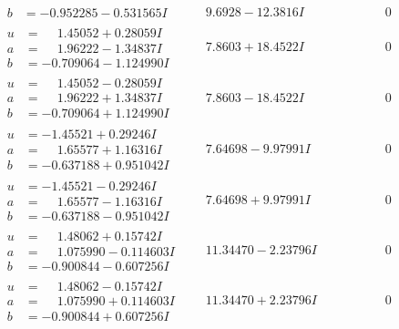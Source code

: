 \documentclass[1p]{elsarticle_modified}
\theoremstyle{definition}
\begin{document}
$$\begin{array}{c|c|c}
\begin{aligned}
b &= -0.952285 - 0.531565 I\end{aligned}
 & \phantom{-}9.6928 - 12.3816 I & \phantom{-0.000000 } 0 \\ \hline\begin{aligned}
u &= \phantom{-}1.45052 + 0.28059 I \\
a &= \phantom{-}1.96222 - 1.34837 I \\
b &= -0.709064 - 1.124990 I\end{aligned}
 & \phantom{-}7.8603 + 18.4522 I & \phantom{-0.000000 } 0 \\ \hline\begin{aligned}
u &= \phantom{-}1.45052 - 0.28059 I \\
a &= \phantom{-}1.96222 + 1.34837 I \\
b &= -0.709064 + 1.124990 I\end{aligned}
 & \phantom{-}7.8603 - 18.4522 I & \phantom{-0.000000 } 0 \\ \hline\begin{aligned}
u &= -1.45521 + 0.29246 I \\
a &= \phantom{-}1.65577 + 1.16316 I \\
b &= -0.637188 + 0.951042 I\end{aligned}
 & \phantom{-}7.64698 - 9.97991 I & \phantom{-0.000000 } 0 \\ \hline\begin{aligned}
u &= -1.45521 - 0.29246 I \\
a &= \phantom{-}1.65577 - 1.16316 I \\
b &= -0.637188 - 0.951042 I\end{aligned}
 & \phantom{-}7.64698 + 9.97991 I & \phantom{-0.000000 } 0 \\ \hline\begin{aligned}
u &= \phantom{-}1.48062 + 0.15742 I \\
a &= \phantom{-}1.075990 - 0.114603 I \\
b &= -0.900844 - 0.607256 I\end{aligned}
 & \phantom{-}11.34470 - 2.23796 I & \phantom{-0.000000 } 0 \\ \hline\begin{aligned}
u &= \phantom{-}1.48062 - 0.15742 I \\
a &= \phantom{-}1.075990 + 0.114603 I \\
b &= -0.900844 + 0.607256 I\end{aligned}
 & \phantom{-}11.34470 + 2.23796 I & \phantom{-0.000000 } 0 \\ \hline\begin{aligned}

\end{aligned}
\end{array}$$
\end{document}
